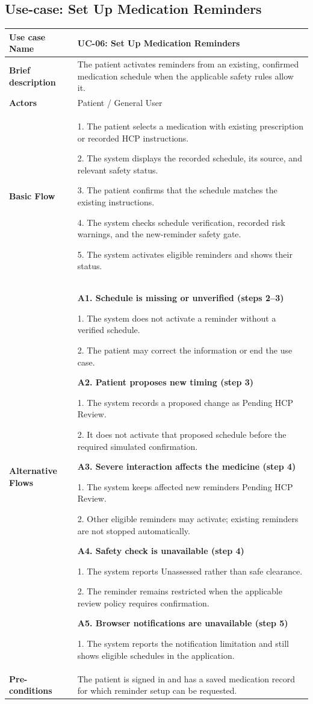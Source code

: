 \subsection{Use-case: Set Up Medication Reminders}
\label{uc:uc-06}
\begin{longtable}{|p{}|p{}|}
\hline
\textbf{Use case Name} & UC-06: Set Up Medication Reminders \\ \hline
\textbf{Brief description} & The patient activates reminders from an existing, confirmed medication schedule when the applicable safety rules allow it. \\ \hline
\textbf{Actors} & Patient / General User \\ \hline
\textbf{Basic Flow} &
1. The patient selects a medication with existing prescription or recorded HCP instructions.\par
2. The system displays the recorded schedule, its source, and relevant safety status.\par
3. The patient confirms that the schedule matches the existing instructions.\par
4. The system checks schedule verification, recorded risk warnings, and the new-reminder safety gate.\par
5. The system activates eligible reminders and shows their status.
\\ \hline
\textbf{Alternative Flows} &
\textbf{A1. Schedule is missing or unverified (steps 2--3)}\par
1. The system does not activate a reminder without a verified schedule.\par
2. The patient may correct the information or end the use case.
\par\smallskip
\textbf{A2. Patient proposes new timing (step 3)}\par
1. The system records a proposed change as Pending HCP Review.\par
2. It does not activate that proposed schedule before the required simulated confirmation.
\par\smallskip
\textbf{A3. Severe interaction affects the medicine (step 4)}\par
1. The system keeps affected new reminders Pending HCP Review.\par
2. Other eligible reminders may activate; existing reminders are not stopped automatically.
\par\smallskip
\textbf{A4. Safety check is unavailable (step 4)}\par
1. The system reports Unassessed rather than safe clearance.\par
2. The reminder remains restricted when the applicable review policy requires confirmation.
\par\smallskip
\textbf{A5. Browser notifications are unavailable (step 5)}\par
1. The system reports the notification limitation and still shows eligible schedules in the application.
\\ \hline
\textbf{Pre-conditions} &
The patient is signed in and has a saved
medication record for which reminder setup
can be requested.
 \\ \hline


\end{longtable}
